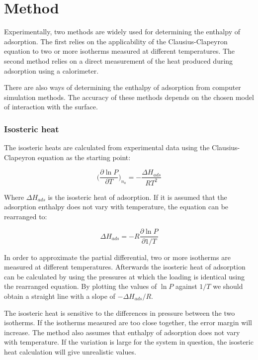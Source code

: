 
\section{Method}

Experimentally, two methods are widely used for determining the 
enthalpy of adsorption. The first relies on the applicability of the 
Clausius-Clapeyron equation to two or more isotherms measured 
at different temperatures. The second method relies on a 
direct measurement of the heat produced during adsorption 
using a calorimeter.

There are also ways of determining the enthalpy of adsorption
from computer simulation methods. The accuracy of these methods
depends on the chosen model of interaction with the surface.

\subsubsection{Isosteric heat}

The isosteric heats are calculated from experimental data using the
Clausius-Clapeyron equation as the starting point:

\begin{equation}
    \Big( \frac{\partial \ln P}{\partial T} \Big)_{n_a} = -\frac{\Delta H_{ads}}{R T^2}
\end{equation}

Where \(\Delta H_{ads}\) is the isosteric heat of adsorption.
If it is assumed that the adsorption enthalpy does not vary with 
temperature, the equation can be rearranged to:

\begin{equation}
    \Delta H_{ads} = - R \frac{\partial \ln P}{\partial 1 / T}
\end{equation}

In order to approximate the partial differential, two or more
isotherms are measured at different temperatures. 
Afterwards the isosteric heat of adsorption can be calculated
by using the pressures at which the loading is identical using the 
rearranged equation. By plotting the values of \(\ln P\) against
\(1 / T\) we should obtain a straight line with a slope
of \(- \Delta H_{ads} / R\).

The isosteric heat is sensitive to the differences in pressure between
the two isotherms. If the isotherms measured are too close together, 
the error margin will increase. The method also assumes that enthalpy 
of adsorption does not vary with temperature. If the
variation is large for the system in question, the isosteric
heat calculation will give unrealistic values.

